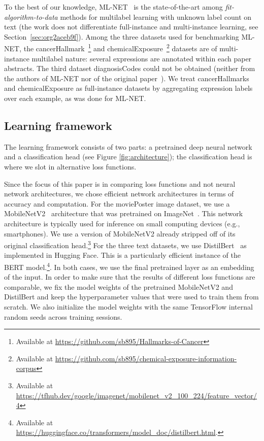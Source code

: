 To the best of our knowledge, ML-NET~\cite{multitaskLabel} is the state-of-the-art among \emph{fit-algorithm-to-data} methods for multilabel learning with unknown label count on text (the work does not differentiate full-instance and multi-instance learning, see Section~\ref{sec:org2aceb9f}). Among the three datasets used for benchmarking ML-NET, the cancerHallmark~\citep{cancerHallmarks}\footnote{Available at \url{https://github.com/sb895/Hallmarks-of-Cancer}} and chemicalExposure~\citep{chemExposure}\footnote{Available at \url{https://github.com/sb895/chemical-exposure-information-corpus}} datasets are of multi-instance multilabel nature: several expressions are annotated within each paper abstracts. The third dataset diagnosisCodes could not be obtained (neither from the authors of ML-NET nor of the original paper~\cite{diagnosisCode}). We treat cancerHallmarks and chemicalExposure as full-instance datasets by aggregating expression labels over each example, as was done for ML-NET.

\subsection{Learning framework}

The learning framework consists of two parts: a pretrained deep neural network and a classification head (see Figure \ref{fig:architecture}); the classification head is where we slot in alternative loss functions.

Since the focus of this paper is in comparing loss functions and not neural network architectures, we chose efficient network architectures in terms of accuracy and computation.
For the moviePoster image dataset, we use a MobileNetV2~\cite{mobileNet} architecture that was pretrained on ImageNet~\cite{imagenet}. This network architecture is typically used for inference on small computing devices (e.g., smartphones). We use a version of MobileNetV2 already stripped off of its original classification head.\footnote{Available at \mbox{\url{https://tfhub.dev/google/imagenet/mobilenet_v2_100_224/feature_vector/4}}}
For the three text datasets, we use DistilBert~\cite{distilBert} as implemented in Hugging Face. This is a particularly efficient instance of the BERT model.\footnote{Available at \url{https://huggingface.co/transformers/model_doc/distilbert.html}.}.
In both cases, we use the final pretrained layer as an embedding of the input. In order to make sure that the results of different loss functions are comparable, we fix the model weights of the pretrained MobileNetV2 and DistilBert and keep the hyperparameter values that were used to train them from scratch. We also initialize the model weights with the same TensorFlow internal random seeds across training sessions.


